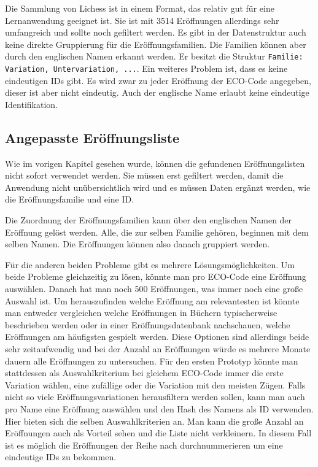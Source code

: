Die Sammlung von Lichess ist in einem Format, das relativ gut für eine Lernanwendung geeignet ist. Sie ist mit 3514 Eröffnungen allerdings sehr umfangreich und sollte noch gefiltert werden. Es gibt in der Datenstruktur auch keine direkte Gruppierung für die Eröffnungsfamilien. Die Familien können aber durch den englischen Namen erkannt werden. Er besitzt die Struktur \lstinline{Familie: Variation, Untervariation, ...}. Ein weiteres Problem ist, dass es keine eindeutigen IDs gibt. Es wird zwar zu jeder Eröffnung der ECO-Code angegeben, dieser ist aber nicht eindeutig. Auch der englische Name erlaubt keine eindeutige Identifikation. 

\subsection{Angepasste Eröffnungsliste}
\label{cp:opening list}
Wie im vorigen Kapitel gesehen wurde, können die gefundenen Eröffnungslisten nicht sofort verwendet werden. Sie müssen erst gefiltert werden, damit die Anwendung nicht unübersichtlich wird und es müssen Daten ergänzt werden, wie die Eröffnungsfamilie und eine ID.

Die Zuordnung der Eröffnungsfamilien kann über den englischen Namen der Eröffnung gelöst werden. Alle, die zur selben Familie gehören, beginnen mit dem selben Namen. Die Eröffnungen können also danach gruppiert werden.

Für die anderen beiden Probleme gibt es mehrere Lösungsmöglichkeiten. Um beide Probleme gleichzeitig zu lösen, könnte man pro ECO-Code eine Eröffnung auswählen. Danach hat man noch 500 Eröffnungen, was immer noch eine große Auswahl ist. Um herauszufinden welche Eröffnung am relevantesten ist könnte man entweder vergleichen welche Eröffnungen in Büchern typischerweise beschrieben werden oder in einer Eröffnungsdatenbank nachschauen, welche Eröffnungen am häufigsten gespielt werden. Diese Optionen sind allerdings beide sehr zeitaufwendig und bei der Anzahl an Eröffnungen würde es mehrere Monate dauern alle Eröffnungen zu untersuchen. Für den ersten Prototyp könnte man stattdessen als Auswahlkriterium bei gleichem ECO-Code immer die erste Variation wählen, eine zufällige oder die Variation mit den meisten Zügen. Falls nicht so viele Eröffnungsvariationen herausfiltern werden sollen, kann man auch pro Name eine Eröffnung auswählen und den Hash des Namens als ID verwenden. Hier bieten sich die selben Auswahlkriterien an. Man kann die große Anzahl an Eröffnungen auch als Vorteil sehen und die Liste nicht verkleinern. In diesem Fall ist es möglich die Eröffnungen der Reihe nach durchnummerieren um eine eindeutige IDs zu bekommen.
